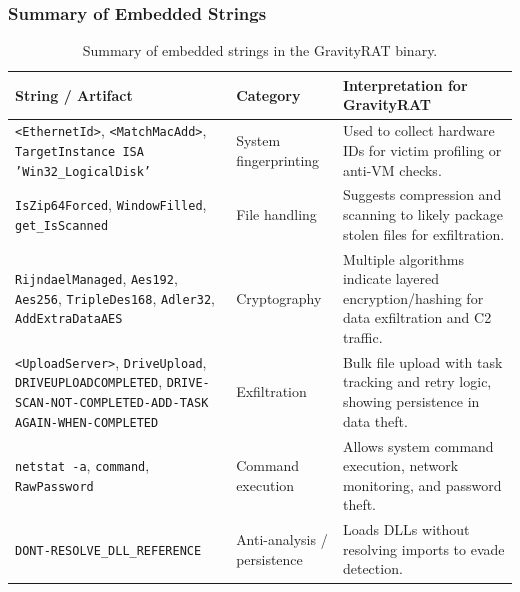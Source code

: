 \documentclass{article}
\begin{document}
\subsubsection{Summary of Embedded Strings}
\begin{table}[H]
  \centering
  \begin{tabular}{|p{5cm}|p{2cm}|p{6cm}|}
    \hline
    \textbf{String / Artifact} & \textbf{Category} & \textbf{Interpretation for GravityRAT} \\
    \hline
    \texttt{<EthernetId>}, \texttt{<MatchMacAdd>}, \texttt{TargetInstance ISA 'Win32\_LogicalDisk'} & System fingerprinting & Used to collect hardware IDs for victim profiling or anti-VM checks. \\
    \hline
    \texttt{IsZip64Forced}, \texttt{WindowFilled}, \texttt{get\_IsScanned} & File handling & Suggests compression and scanning to likely package stolen files for exfiltration. \\
    \hline
    \texttt{RijndaelManaged}, \texttt{Aes192}, \texttt{Aes256}, \texttt{TripleDes168}, \texttt{Adler32}, \texttt{AddExtraDataAES} & Cryptography & Multiple algorithms indicate layered encryption/hashing for data exfiltration and C2 traffic. \\
    \hline
    \texttt{<UploadServer>}, \texttt{DriveUpload}, \texttt{DRIVEUPLOADCOMPLETED}, \texttt{DRIVE-SCAN-NOT-COMPLETED-ADD-TASK AGAIN-WHEN-COMPLETED} & Exfiltration & Bulk file upload with task tracking and retry logic, showing persistence in data theft. \\
    \hline
    \texttt{netstat -a}, \texttt{command}, \texttt{RawPassword} & Command execution & Allows system command execution, network monitoring, and password theft. \\
    \hline
    \texttt{DONT-RESOLVE\_DLL\_REFERENCE} & Anti-analysis / persistence & Loads DLLs without resolving imports to evade detection. \\
    \hline
  \end{tabular}
  \caption{Summary of embedded strings in the GravityRAT binary.}
  \label{tab:gravityrat-strings}
\end{table}
\end{document}
